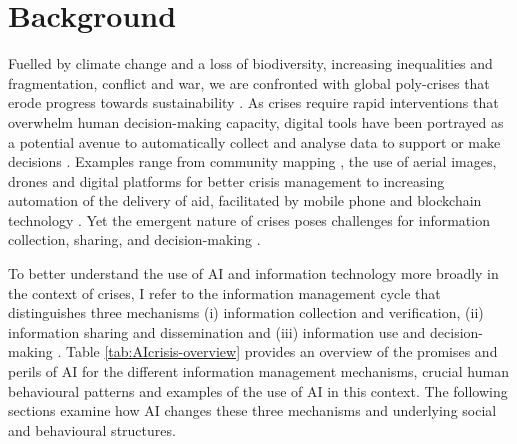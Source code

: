 \documentclass[pdflatex,sn-apa]{sn-jnl}%
\begin{document}
\section{Background}

Fuelled by climate change and a loss of biodiversity, increasing inequalities and fragmentation, conflict and war, we are confronted with global poly-crises that erode progress towards sustainability \citep{sogaard2024evolution}. As crises require rapid interventions that overwhelm human decision-making capacity, digital tools have been portrayed as a potential avenue to automatically collect and analyse data to support or make decisions \citep{qadir2016crisis}. Examples range from community mapping \citep{champlin2023measuring, soden2014crowdsourced}, the use of aerial images, drones and digital platforms for better crisis management \citep{voigt2007satellite} to increasing automation of the delivery of aid, facilitated by mobile phone and blockchain technology \citep{coughlan2015forecast, baharmand2019leveraging}. Yet the emergent nature of crises poses challenges for information collection, sharing, and decision-making \citep{turoff2004design, nespeca2020towards}.

To better understand the use of AI and information technology more broadly in the context of crises, I refer to the information management cycle that distinguishes three mechanisms (i) information collection and verification, (ii) information sharing and dissemination and (iii) information use and decision-making \citep{van2015On}. Table \ref{tab:AIcrisis-overview} provides an overview of the promises and perils of AI for the different information management mechanisms, crucial human behavioural patterns and examples of the use of AI in this context. The following sections examine how AI changes these three mechanisms and underlying social and behavioural structures.
\end{document}
